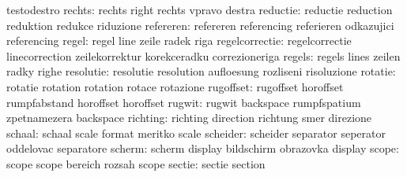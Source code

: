                            testodestro               %
                   rechts: rechts                    right
                           rechts                    vpravo
                           destra
                 reductie: reductie                  reduction
                           reduktion                 redukce
                           riduzione
                refereren: refereren                 referencing
                           referieren                odkazujici
                           referencing               %
                    regel: regel                     line
                           zeile                     radek
                           riga
           regelcorrectie: regelcorrectie            linecorrection
                           zeilekorrektur            korekceradku
                           correzioneriga
                   regels: regels                    lines
                           zeilen                    radky
                           righe
                resolutie: resolutie                 resolution
                           aufloesung                rozliseni
                           risoluzione
                  rotatie: rotatie                   rotation
                           rotation                  rotace
                           rotazione
                rugoffset: rugoffset                 horoffset
                           rumpfabstand              horoffset
                           horoffset                 %
                   rugwit: rugwit                    backspace
                           rumpfspatium              zpetnamezera
                           backspace                 %
                 richting: richting                  direction
                           richtung                  smer
                           direzione
                   schaal: schaal                    scale
                           format                    meritko
                           scale                     %
                 scheider: scheider                  separator
                           seperator                 oddelovac
                           separatore
                   scherm: scherm                    display
                           bildschirm                obrazovka
                           display                   %
                    scope: scope                     scope
                           bereich                   rozsah
                           scope                     %
                   sectie: sectie                    section
